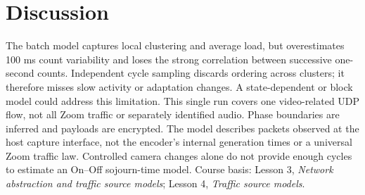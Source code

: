 \documentclass[10pt]{article}
\begin{document}
\vspace{-0.6em}
\section{Discussion}
The batch model captures local clustering and average load, but overestimates
100 ms count variability and loses the strong correlation between successive
one-second counts. Independent cycle sampling discards ordering across clusters;
it therefore misses slow activity or adaptation changes. A state-dependent or
block model could address this limitation.
This single run covers one video-related UDP flow, not all Zoom traffic or
separately identified audio. Phase boundaries are inferred and payloads are
encrypted. The model describes packets observed at the host capture interface,
not the encoder's internal generation times or a universal Zoom traffic law.
Controlled camera changes alone do not provide enough cycles to estimate an
On--Off sojourn-time model. Course basis: Lesson 3, \emph{Network abstraction and
traffic source models}; Lesson 4, \emph{Traffic source models}.
\end{document}
